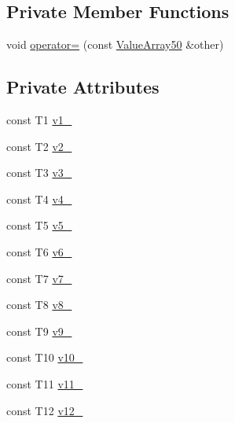 \subsection*{\-Private \-Member \-Functions}
\begin{DoxyCompactItemize}
\item 
void \hyperlink{classtesting_1_1internal_1_1ValueArray50_a15eafc2ba087ba2c0fbf2e0d8480309a}{operator=} (const \hyperlink{classtesting_1_1internal_1_1ValueArray50}{\-Value\-Array50} \&other)
\end{DoxyCompactItemize}
\subsection*{\-Private \-Attributes}
\begin{DoxyCompactItemize}
\item 
const \-T1 \hyperlink{classtesting_1_1internal_1_1ValueArray50_aac1d0654cc6c1aceb4a5d0fa7a98042e}{v1\-\_\-}
\item 
const \-T2 \hyperlink{classtesting_1_1internal_1_1ValueArray50_a9f0a8ce6ce2fd27e980c4c51a7a7256a}{v2\-\_\-}
\item 
const \-T3 \hyperlink{classtesting_1_1internal_1_1ValueArray50_a4f8257321a2eab0456239174d6712d5e}{v3\-\_\-}
\item 
const \-T4 \hyperlink{classtesting_1_1internal_1_1ValueArray50_aac184059fee257381ccae81d8d112f85}{v4\-\_\-}
\item 
const \-T5 \hyperlink{classtesting_1_1internal_1_1ValueArray50_a1f3e0ada8419ed2e17cc61e6c0c54404}{v5\-\_\-}
\item 
const \-T6 \hyperlink{classtesting_1_1internal_1_1ValueArray50_a13d84d5824617bbc6fb1a6b3ee3cb745}{v6\-\_\-}
\item 
const \-T7 \hyperlink{classtesting_1_1internal_1_1ValueArray50_a4063f0b7a528133d018ee488ba44a9a3}{v7\-\_\-}
\item 
const \-T8 \hyperlink{classtesting_1_1internal_1_1ValueArray50_a596bc5260b2474271d1f6910ff6f665d}{v8\-\_\-}
\item 
const \-T9 \hyperlink{classtesting_1_1internal_1_1ValueArray50_a6356e16cf54a9dfac8525f20242af31e}{v9\-\_\-}
\item 
const \-T10 \hyperlink{classtesting_1_1internal_1_1ValueArray50_a147ca4457ea439b00a93087231ff77ef}{v10\-\_\-}
\item 
const \-T11 \hyperlink{classtesting_1_1internal_1_1ValueArray50_a12a4baf9ab57c7e9b5b4f1612e59e529}{v11\-\_\-}
\item 
const \-T12 \hyperlink{classtesting_1_1internal_1_1ValueArray50_a35ffe6d4d723857722ab319a235eddfc}{v12\-\_\-}

\end{DoxyCompactItemize}

